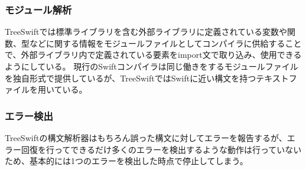 \subsubsection{モジュール解析}

TreeSwiftでは標準ライブラリを含む外部ライブラリに定義されている変数や関数、型などに関する情報をモジュールファイルとしてコンパイラに供給することで、外部ライブラリ内で定義されている要素をimport文で取り込み、使用できるようにしている。
現行のSwiftコンパイラは同じ働きをするモジュールファイルを独自形式で提供しているが、TreeSwiftではSwiftに近い構文を持つテキストファイルを用いている。

\subsubsection{エラー検出}

TreeSwiftの構文解析器はもちろん誤った構文に対してエラーを報告するが、エラー回復を行ってできるだけ多くのエラーを検出するような動作は行っていないため、基本的には1つのエラーを検出した時点で停止してしまう。

